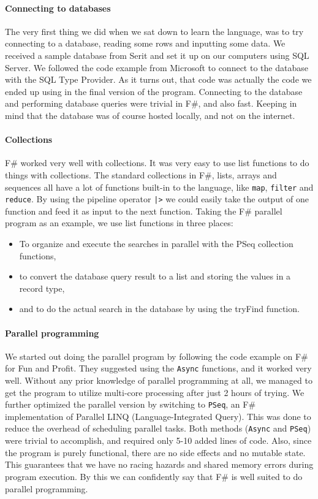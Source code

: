 \documentclass[12pt, a4paper]{article}
\newcommand{\code}[1]{{\small \texttt{#1}}}
\begin{document}
\paragraph{Connecting to databases} The very first thing we did when we sat down to learn the language, was to try connecting to a database, reading some rows and inputting some data. We received a sample database from Serit and set it up on our computers using SQL Server. We followed the code example from Microsoft to connect to the database with the SQL Type Provider. As it turns out, that code was actually the code we ended up using in the final version of the program. Connecting to the database and performing database queries were trivial in F\#, and also fast. Keeping in mind that the database was of course hosted locally, and not on the internet.

\paragraph{Collections} F\# worked very well with collections. It was very easy to use list functions to do things with collections. The standard collections in F\#, lists, arrays and sequences all have a lot of functions built-in to the language, like \code{map}, \code{filter} and \code{reduce}. By using the pipeline operator \code{|>} we could easily take the output of one function and feed it as input to the next function. Taking the F\# parallel program as an example, we use list functions in three places: 

\begin{itemize}
	\item To organize and execute the searches in parallel with the PSeq collection functions,
	\item to convert the database query result to a list and storing the values in a record type,
	\item and to do the actual search in the database by using the tryFind function.
\end{itemize}

\paragraph{Parallel programming} We started out doing the parallel program by following the code example on F\# for Fun and Profit. They suggested using the \code{Async} functions, and it worked very well. Without any prior knowledge of parallel programming at all, we managed to get the program to utilize multi-core processing after just 2 hours of trying. We further optimized the parallel version by switching to \code{PSeq}, an F\# implementation of Parallel LINQ (Language-Integrated Query). This was done to reduce the overhead of scheduling parallel tasks. Both methods (\code{Async} and \code{PSeq}) were trivial to accomplish, and required only 5-10 added lines of code. Also, since the program is purely functional, there are no side effects and no mutable state. This guarantees that we have no racing hazards and shared memory errors during program execution. By this we can confidently say that F\# is well suited to do parallel programming.
\end{document}
